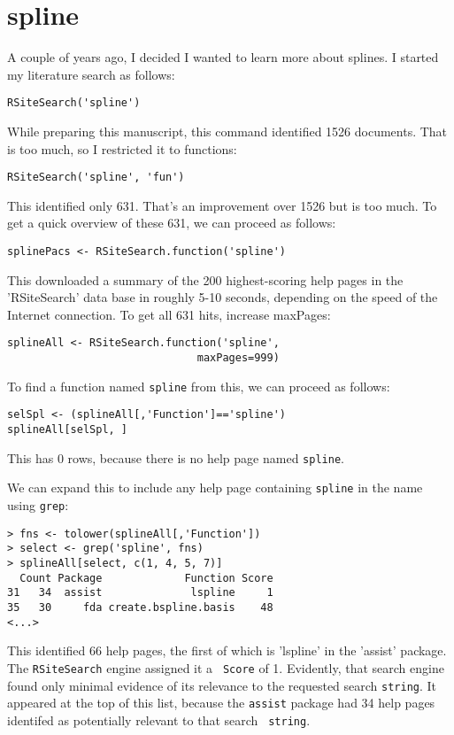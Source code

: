\section*{spline}

A couple of years ago, I decided I wanted to learn more about
splines.  I started my literature search as follows:
\begin{verbatim}
RSiteSearch('spline')
\end{verbatim}
While preparing this manuscript, this command identified 1526
documents.  That is too much, so I restricted it to functions:
\begin{verbatim}
RSiteSearch('spline', 'fun')
\end{verbatim}
This identified only 631.  That's an improvement over 1526 but is too
much.  To get a quick overview of these 631, we can proceed as
follows:
\begin{verbatim}
splinePacs <- RSiteSearch.function('spline')
\end{verbatim}
This downloaded a summary of the 200 highest-scoring help pages in
the 'RSiteSearch' data base in roughly 5-10 seconds, depending on the
speed of the Internet connection.  To get all 631 hits, increase
maxPages:
\begin{verbatim}
splineAll <- RSiteSearch.function('spline',
                              maxPages=999)
\end{verbatim}
To find a function named {\tt spline} from this, we can proceed as
follows:
\begin{verbatim}
selSpl <- (splineAll[,'Function']=='spline')
splineAll[selSpl, ]
\end{verbatim}
This has 0 rows, because there is no help page named {\tt spline}.

We can expand this to include any help page containing {\tt spline} in
the name using {\tt grep}:
\begin{verbatim}
> fns <- tolower(splineAll[,'Function'])
> select <- grep('spline', fns)
> splineAll[select, c(1, 4, 5, 7)]
  Count Package             Function Score
31   34  assist              lspline     1
35   30     fda create.bspline.basis    48
<...>
\end{verbatim}
This identified 66 help pages, the first of which is 'lspline' in the
'assist' package.  The {\tt RSiteSearch} engine assigned it a {\tt
Score} of 1.  Evidently, that search engine found only minimal
evidence of its relevance to the requested search {\tt string}.  It
appeared at the top of this list, because the {\tt assist} package had
34 help pages identifed as potentially relevant to that search {\tt
string}.

